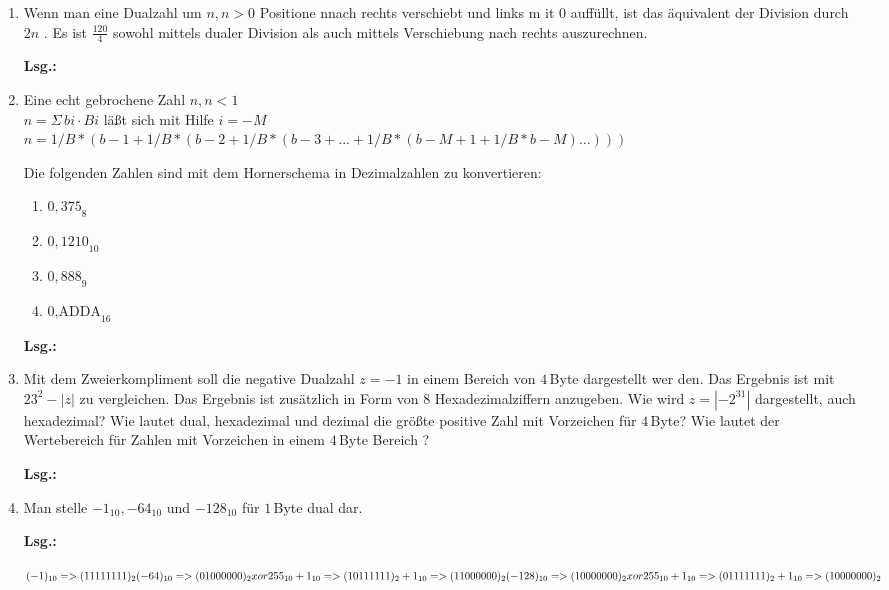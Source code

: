 \documentclass[12pt,a4paper]{scrreprt}
\newcommand{\Lsg}{\par \textbf{Lsg.: \hfill }}
\begin{document}
\begin{enumerate}
\Lsg%

\item Wenn man eine Dualzahl um $n, n>0$ Positione nnach rechts verschiebt und links m it $0$ auffüllt, ist das äquivalent der Division durch $2n$ . Es ist $\frac{120}{4}$ sowohl mittels dualer Division als auch mittels Verschiebung nach rechts auszurechnen.

\Lsg%

\item Eine echt gebrochene Zahl $n, n<1$ \\
\begin{math}
n =
\Sigma\,bi \cdot B
i
\end{math}
läßt sich mit Hilfe
$i = -M$
\begin{math}
n = 1/B*(b -1 + 1 / B * ( b -2 + 1/B*(b -3 + ... + 1/B*(b -M +1 + 1 / B * b -M ) \ldots)))
\end{math}

Die folgenden Zahlen sind mit dem Hornerschema in Dezimalzahlen zu konvertieren:

\begin{enumerate}
	\item ${0,375}_{8}$
	\item ${0,1210}_{10}$
	\item ${0,888}_{9}$
	\item $\text{0,ADDA}_{16}$
\end{enumerate}

\Lsg%

\item Mit dem Zweierkompliment soll die negative Dualzahl $z =-1$ in einem Bereich von $4$\,Byte dargestellt wer den. Das Ergebnis ist mit $23^2-|z|$ zu vergleichen. Das Ergebnis ist zusätzlich in Form von $8$ Hexadezimalziffern anzugeben. Wie wird $z=|-2^31|$ dargestellt, auch hexadezimal?
Wie lautet dual, hexadezimal und dezimal die größte positive Zahl mit Vorzeichen für $4$\,Byte? Wie lautet der Wertebereich für Zahlen mit Vorzeichen in einem $4$\,Byte Bereich ?

\Lsg%

\item Man stelle ${-1}_{10}, {-64}_{10}$ und ${-128}_{10}$ für $1$\,Byte dual dar. \\

\Lsg

\begin{math}
      (-1)_{10} => (11111111)_2 \\
     (-64)_{10} => (01000000)_2 xor 255_{10} + 1_{10} \\ => (10111111)_2 + 1_{10} => (11000000)_2 \\
    (-128)_{10} => (10000000)_2 xor 255_{10} + 1_{10} \\ => (01111111)_2 + 1_{10} => (10000000)_2 
\end{math}

\end{enumerate}
\end{document}
